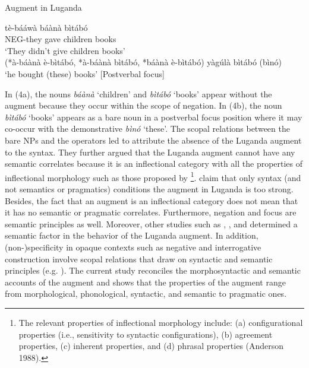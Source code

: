 \documentclass[output=paper]{langscibook}
\begin{document}
\begin{exe}
\ex Augment in Luganda\label{hayagusii4}
\begin{xlist}
\ex \gll	tè-bááwà               báànà    bìtábó \\			
            NEG-they gave    children    books \\
      \trans     ‘They didn’t give children books’\\
           (*à-báànà  è-bìtábó, *à-báànà  bìtábó, *báànà  è-bìtábó)  
\ex 	yàgúlà  bìtábó  (bìnó) \\
        ‘he bought (these) books’  [Postverbal focus]
\end{xlist}
\end{exe}
In (4a), the nouns \textit{báànà} ‘children’ and \textit{bìtábó} ‘books’ appear without the augment because they occur within the scope of negation. In (4b), the noun \textit{bìtábó} ‘books’ appears as a bare noun in a postverbal focus position where it may co-occur with the demonstrative \textit{bìnó} ‘these’. The scopal relations between the bare NPs and the operators led \citet{hyman1993augment} to attribute the absence of the Luganda augment to the syntax. They further argued that the Luganda augment cannot have any semantic correlates because it is an inflectional category with all the properties of inflectional morphology such as those proposed by \citet{anderson1988inflection}\footnote{The relevant properties of inflectional morphology include: (a) configurational properties (i.e., sensitivity to syntactic configurations), (b) agreement properties, (c) inherent properties, and (d) phrasal properties (Anderson 1988).}. \citet{hyman1993augment} claim that only syntax (and not semantics or pragmatics) conditions the augment in Luganda is too strong. Besides, the fact that an augment is an inflectional category does not mean that it has no semantic or pragmatic correlates. Furthermore, negation and focus are semantic principles as well. Moreover, other studies such as \citet[30]{ashton1987luganda}, \citet{mould1974syntax}, and \citet{ferrari2009} determined a semantic factor in the behavior of the Luganda augment. In addition, (non-)specificity in opaque contexts such as negative and interrogative construction involve scopal relations that draw on syntactic and semantic principles (e.g. \citep{abusch1993scope,lyons1999definiteness,winter1997choice}). The current study reconciles the morphosyntactic and semantic accounts of the augment and shows that the properties of the augment range from morphological, phonological, syntactic, and semantic to pragmatic ones.
	
\end{document}
